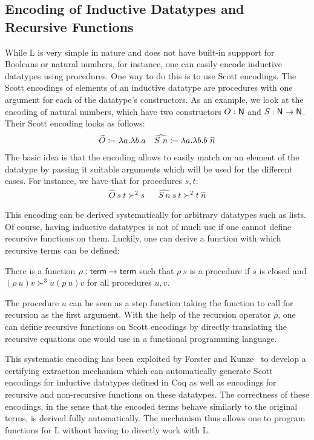 \subsection{Encoding of Inductive Datatypes and Recursive Functions}
While L is very simple in nature and does not have built-in suppport for Booleans or natural numbers, for instance, one can easily encode inductive datatypes using procedures. One way to do this is to use Scott encodings. 
The Scott encodings of elements of an inductive datatype are procedures with one argument for each of the datatype's constructors. 
As an example, we look at the encoding of natural numbers, which have two constructors $O : \mathsf{N}$ and $S : \mathsf{N} \rightarrow \mathsf{N}$.
Their Scott encoding looks as follows: 
\begin{align*}
  \widehat{O} \coloneqq \lambda a. \lambda b. a 
  && \widehat{S~n} \coloneqq \lambda a. \lambda b. b~\widehat{n}
\end{align*}
The basic idea is that the encoding allows to easily match on an element of the datatype by passing it suitable arguments which will be used for the different cases. 
For instance, we have that for procedures $s, t$: 
\begin{align*}
  \widehat{O}~s~t \succ^2 s && \widehat{S~n}~s~t \succ^2 t~\widehat{n} 
\end{align*}

This encoding can be derived systematically for arbitrary datatypes such as lists.
Of course, having inductive datatypes is not of much use if one cannot define recursive functions on them. 
Luckily, one can derive a function with which recursive terms can be defined: 
\begin{fact}
  There is a function $\rho : \textsf{term} \rightarrow \textsf{term}$ such that $\rho~s$ is a procedure if $s$ is closed and $(\rho~u)v \succ^3 u(p~u)v$ for all procedures $u, v$.
\end{fact}
The procedure $u$ can be seen as a step function taking the function to call for recursion as the first argument. 
With the help of the recursion operator $\rho$, one can define recursive functions on Scott encodings by directly translating the recursive equations one would use in a functional programming language.

This systematic encoding has been exploited by Forster and Kunze~\cite{ForsterKunze:2019:Certifying-extraction} to develop a certifying extraction mechanism which can automatically generate Scott encodings for inductive datatypes defined in Coq as well as encodings for recursive and non-recursive functions on these datatypes. The correctness of these encodings, in the sense that the encoded terms behave similarly to the original terms, is derived fully automatically.
The mechanism thus allows one to program functions for L without having to directly work with L.

